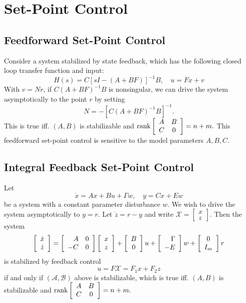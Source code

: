 \documentclass{report}
\begin{document}
\section{Set-Point Control}

\subsection{Feedforward Set-Point Control}
Consider a system stabilized by state feedback, which has the
following closed loop transfer function and input:
$$
H(s) = C[sI - (A + BF)]^{-1} B, \quad
u = F x + v
$$
With $v = N r$, if $C(A + BF)^{-1}B$ is nonsingular, we can drive the
system asymptotically to the point $r$ by setting
$$
N = -[C(A + BF)^{-1} B]^{-1}.
$$
This is true iff. $(A, B)$ is stabilizable and
$
\mathrm{rank}
\left[\begin{array}{c c}
  A & B \\
  C & 0
\end{array}\right] = n + m.
$
This feedforward set-point control is sensitive to the model
parameters $A, B, C$.

\subsection{Integral Feedback Set-Point Control}
Let
$$
\dot{x} = Ax + Bu + \Gamma w, \quad
y = Cx + Ew
$$
be a system with a constant parameter disturbance $w$. We wish to
drive the system asymptotically to $y = r$. Let $\dot{z} = r - y$ and write
$
\mathcal{X} =
\left[\begin{array}{c}
  x \\ z
\end{array}\right].
$
Then the system
$$
\left[\begin{array}{c}
  \dot{x} \\
  \dot{z}
\end{array}\right]
=
\left[\begin{array}{r r}
  A & 0 \\
 -C & 0
\end{array}\right]
\left[\begin{array}{c}
  x \\
  z
\end{array}\right]
+
\left[\begin{array}{c}
  B \\
  0
\end{array}\right]
u
+
\left[\begin{array}{r}
   \Gamma \\
  -E
\end{array}\right]
w
+
\left[\begin{array}{c}
  0 \\
  I_m
\end{array}\right]
r
$$
is stabilized by feedback control
$$
u = F \mathcal{X} = F_1 x + F_2 z
$$
if and only if $(\mathcal{A}, \mathcal{B})$ above is stabilizable,
which is true iff. $(A, B)$ is stabilizable and
$
\mathrm{rank}
\left[\begin{array}{c c}
  A & B \\
  C & 0
\end{array}\right] = n + m.
$
\end{document}

